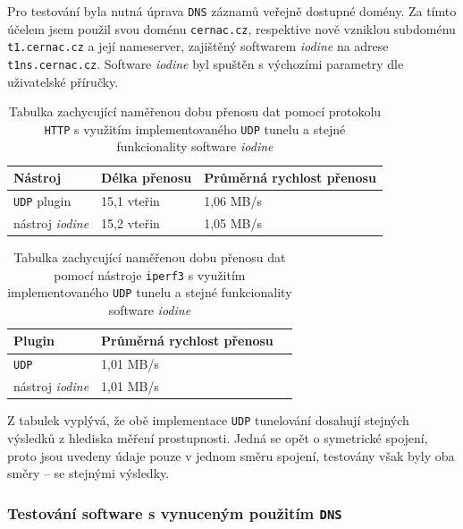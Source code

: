 \documentclass[thesis=M,czech]{FITthesis}[2012/10/20]
\begin{document}
Pro testování byla nutná úprava \texttt{DNS} záznamů veřejně dostupné domény. Za tímto účelem jsem použil svou doménu \texttt{cernac.cz}, respektive nově vzniklou subdoménu \texttt{t1.cernac.cz} a její nameserver, zajištěný softwarem \textit{iodine} na adrese \texttt{t1ns.cernac.cz}. Software \textit{iodine} byl spuštěn s výchozími parametry dle uživatelské příručky\cite{iodine-repo}.

    \begin{table}[h]
	\centering
	\begin{tabular}{|l||l|l|}
	\hline
	Nástroj & Délka přenosu & Průměrná rychlost přenosu \\ \hline \hline
	\texttt{UDP} plugin         & 15,1 vteřin   & 1,06 MB/s                 \\ \hline
	nástroj \textit{iodine}& 15,2 vteřin   & 1,05 MB/s                 \\ \hline
	\end{tabular}
	\caption{Tabulka zachycující naměřenou dobu přenosu dat pomocí protokolu \texttt{HTTP} s využitím implementovaného \texttt{UDP} tunelu a stejné funkcionality software \textit{iodine}}
	\label{tab:http-download-iod}
    \end{table}
    
    
    \begin{table}[h]
	\centering
	\begin{tabular}{|l||l|l|}
	\hline
	Plugin   & Průměrná rychlost přenosu \\ \hline \hline
	\texttt{UDP}       & 1,01 MB/s                 \\ \hline
	nástroj \textit{iodine}  & 1,01 MB/s                 \\ \hline
	\end{tabular}
	\caption{Tabulka zachycující naměřenou dobu přenosu dat pomocí nástroje \texttt{iperf3} s využitím implementovaného \texttt{UDP} tunelu a stejné funkcionality software \textit{iodine}}
	\label{tab:iperf-iod}
    \end{table}
    
     Z tabulek vyplývá, že obě implementace \texttt{UDP} tunelování dosahují stejných výsledků z hlediska měření prostupnosti. Jedná se opět o symetrické spojení, proto jsou uvedeny údaje pouze v jednom směru spojení, testovány však byly oba směry -- se stejnými výsledky.
     
     
\subsubsection{Testování software s vynuceným použitím \texttt{DNS}}
\end{document}
